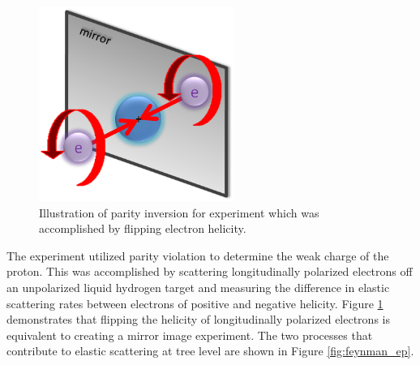 \begin{figure}[ht]
\centering
\includegraphics[width=2.5in]{Pictures/parity_inversion.PNG}
\caption{Illustration of parity inversion for \Qs experiment which was accomplished by flipping electron helicity.}
\label{fig:mirror_parity_inversion}
\end{figure}

The \Qs experiment utilized parity violation to determine the weak charge of the proton. This was accomplished by scattering longitudinally polarized electrons off an unpolarized liquid hydrogen target and measuring the difference in elastic scattering rates between electrons of positive and negative helicity. Figure \ref{fig:mirror_parity_inversion} demonstrates that flipping the helicity of longitudinally polarized electrons is equivalent to creating a mirror image experiment. The two processes that contribute to elastic scattering at tree level are shown in Figure \ref{fig:feynman_ep}.

